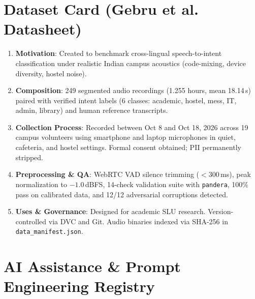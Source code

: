 \documentclass[sigconf,authordraft]{acmart}
\begin{document}
\section{Dataset Card (Gebru et al. Datasheet)}
\label{app:datasheet}

\begin{enumerate}
  \item \textbf{Motivation}: Created to benchmark cross-lingual speech-to-intent classification under realistic Indian campus acoustics (code-mixing, device diversity, hostel noise).
  \item \textbf{Composition}: 249 segmented audio recordings (1.255 hours, mean 18.14\,s) paired with verified intent labels (6 classes: academic, hostel, mess, IT, admin, library) and human reference transcripts.
  \item \textbf{Collection Process}: Recorded between Oct 8 and Oct 18, 2026 across 19 campus volunteers using smartphone and laptop microphones in quiet, cafeteria, and hostel settings. Formal consent obtained; PII permanently stripped.
  \item \textbf{Preprocessing \& QA}: WebRTC VAD silence trimming ($<300$\,ms), peak normalization to $-1.0$\,dBFS, 14-check validation suite with \texttt{pandera}, 100\% pass on calibrated data, and 12/12 adversarial corruptions detected.
  \item \textbf{Uses \& Governance}: Designed for academic SLU research. Version-controlled via DVC and Git. Audio binaries indexed via SHA-256 in \texttt{data\_manifest.json}.
\end{enumerate}

\section{AI Assistance \& Prompt Engineering Registry}
\label{app:ai_registry}
\end{document}
